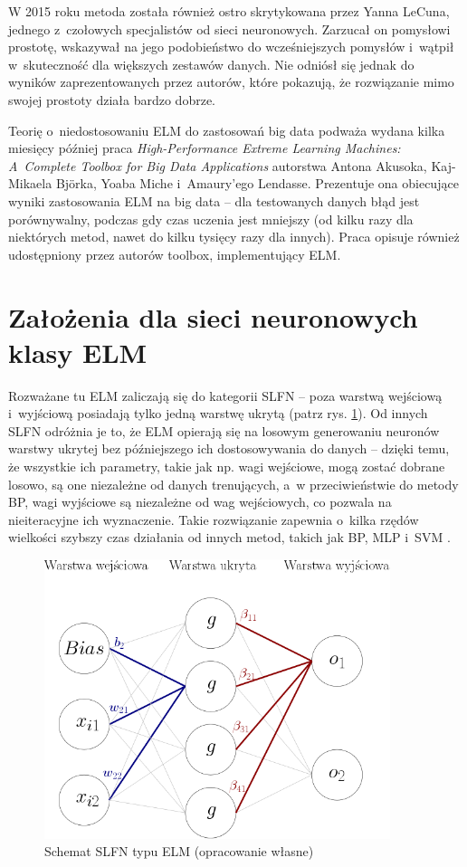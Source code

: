 \documentclass[pl]{minipw} %
\begin{document}
W 2015 roku metoda została również ostro skrytykowana przez Yanna LeCuna, jednego z~czołowych specjalistów od sieci neuronowych. Zarzucał on pomysłowi prostotę, wskazywał na jego podobieństwo do wcześniejszych pomysłów i~wątpił w~skuteczność dla większych zestawów danych. Nie odniósł się jednak do wyników zaprezentowanych przez autorów, które pokazują, że rozwiązanie mimo swojej prostoty działa bardzo dobrze.

Teorię o~niedostosowaniu ELM do zastosowań big data podważa wydana kilka miesięcy później praca \textit{High-Performance Extreme Learning Machines: A~Complete Toolbox for Big Data Applications} \cite{akusok-hpelm} autorstwa Antona Akusoka, Kaj-Mikaela Bj\"orka, Yoaba Miche i~Amaury'ego Lendasse. Prezentuje ona obiecujące wyniki zastosowania ELM na big data -- dla testowanych danych błąd jest porównywalny, podczas gdy czas uczenia jest mniejszy (od kilku razy dla niektórych metod, nawet do kilku tysięcy razy dla innych). Praca opisuje również udostępniony przez autorów toolbox, implementujący ELM.

\clearpage
\section{Założenia dla sieci neuronowych klasy ELM}
Rozważane tu ELM zaliczają się do kategorii SLFN -- poza warstwą wejściową i~wyjściową posiadają tylko jedną warstwę ukrytą (patrz rys. \ref{schemat_elm}). Od innych SLFN odróżnia je to, że ELM opierają się na losowym generowaniu neuronów warstwy ukrytej bez późniejszego ich dostosowywania do danych -- dzięki temu, że wszystkie ich parametry, takie jak np. wagi wejściowe, mogą zostać dobrane losowo, są one niezależne od danych trenujących, a~w przeciwieństwie do metody BP, wagi wyjściowe są niezależne od wag wejściowych, co pozwala na nieiteracyjne ich wyznaczenie. Takie rozwiązanie zapewnia o~kilka rzędów wielkości szybszy czas działania od innych metod, takich jak BP, MLP i~SVM \cite{akusok-hpelm}.
\begin{figure}[H]
\centering
\includegraphics[width=0.9\textwidth]{schemat_sieci.png}
\caption[Schemat SLFN typu ELM]{Schemat SLFN typu ELM (opracowanie własne)}
\label{schemat_elm}
\end{figure}
\end{document}
